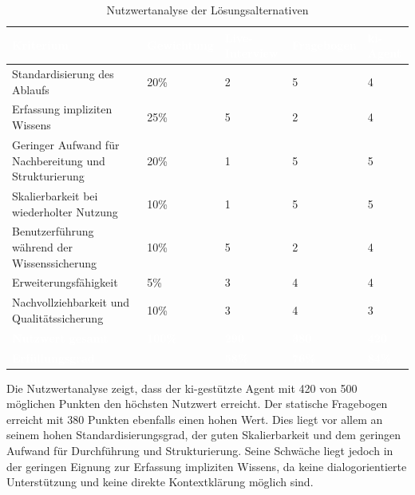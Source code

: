\documentclass[
  10pt,
  ngerman,
  a4paper,
  toc=graduated,
  numbers=noenddot,
  headings=standardclasses,
  nonumberlist
]{scrartcl}
\begin{document}
\begin{table}[h]
\centering
\begin{tabularx}{\textwidth}{|Y|R{1.8cm}|R{2.0cm}|R{2.0cm}|R{2.0cm}|}
\hline
{}
\textcolor{white}{\textbf{Kriterium}} 
& \textcolor{white}{\textbf{Gewichtung}} 
& \textcolor{white}{\textbf{Live-Interview}} 
& \textcolor{white}{\textbf{Fragebogen}} 
& \textcolor{white}{\textbf{\gls{ki}-Agent}} \\
\hline

Standardisierung des Ablaufs 
& 20\% 
& 2 
& 5 
& 4 \\
\hline

Erfassung impliziten Wissens 
& 25\% 
& 5 
& 2 
& 4 \\
\hline

Geringer Aufwand für Nachbereitung und Strukturierung 
& 20\% 
& 1 
& 5 
& 5 \\
\hline

Skalierbarkeit bei wiederholter Nutzung 
& 10\% 
& 1 
& 5 
& 5 \\
\hline

Benutzerführung während der Wissenssicherung
& 10\% 
& 5
& 2 
& 4 \\
\hline

Erweiterungsfähigkeit 
& 5\% 
& 3 
& 4 
& 4 \\
\hline

Nachvollziehbarkeit und Qualitätssicherung 
& 10\% 
& 3 
& 4 
& 3 \\
\hline

\textcolor{white}{\textbf{Nutzwert gesamt}} 
& \textcolor{white}{\textbf{100\%}} 
& \textcolor{white}{\textbf{290}} 
& \textcolor{white}{\textbf{380}} 
& \textcolor{white}{\textbf{420}} \\
\hline

\textcolor{white}{\textbf{Erfüllungsgrad}} 
& 
& \textcolor{white}{\textbf{58\%}} 
& \textcolor{white}{\textbf{76\%}} 
& \textcolor{white}{\textbf{84\%}} \\
\hline

\end{tabularx}
\caption{Nutzwertanalyse der Lösungsalternativen}
\label{tab:nutzwertanalyse}
\end{table}

Die Nutzwertanalyse zeigt, dass der \gls{ki}-gestützte Agent mit 420 von 500 möglichen Punkten den höchsten Nutzwert erreicht. Der statische Fragebogen erreicht mit 380 Punkten ebenfalls einen hohen Wert. Dies liegt vor allem an seinem hohen Standardisierungsgrad, der guten Skalierbarkeit und dem geringen Aufwand für Durchführung und Strukturierung. Seine Schwäche liegt jedoch in der geringen Eignung zur Erfassung impliziten Wissens, da keine dialogorientierte Unterstützung und keine direkte Kontextklärung möglich sind.
\end{document}
